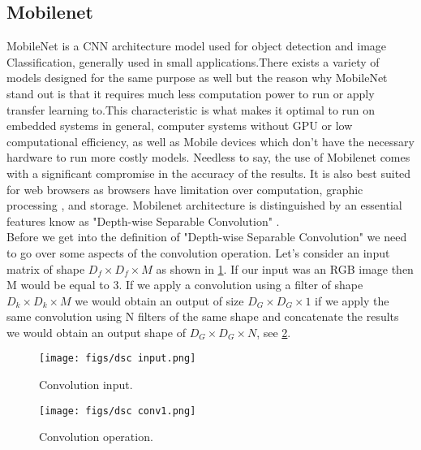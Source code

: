 \subsection{Mobilenet}
MobileNet is a CNN architecture model  used for object detection and image Classification, generally used in small applications.There exists a variety of models designed for the same purpose as well but the reason why MobileNet stand out is that it requires much less computation power to run or apply transfer learning to.This characteristic is what makes it optimal to run on embedded systems in general, computer systems without GPU or low computational efficiency, as well as Mobile devices which don't have the necessary hardware to run more costly models. Needless to say, the use of Mobilenet comes with a significant compromise in the accuracy of the results. It is also best suited for web browsers as browsers have limitation over computation, graphic processing , and storage. Mobilenet architecture is distinguished by an essential features know as "Depth-wise Separable Convolution" \cite{b11}.\\
Before we get into the definition of "Depth-wise Separable Convolution" we need to go over some aspects of the convolution operation. Let's consider an input matrix of shape $D_{f} \times D_{f} \times M $ as shown in \cref{fig:dsc_input}. If our input was an RGB image then M would be equal to 3. If we apply a convolution using a filter of shape $D_{k} \times D_{k} \times M $ we would obtain an output of size $D_{G} \times D_{G} \times 1 $ if we apply the same convolution using N filters of the same shape and concatenate the results we would obtain an output shape of $D_{G} \times D_{G} \times N $, see \cref{fig:dsc_conv1}.

\begin{figure}[ht]
	\centering
	\texttt{[image: figs/dsc input.png]}
	\caption{Convolution input.}\label{fig:dsc_input}
\end{figure}

\begin{figure}[ht]
	\centering
	\texttt{[image: figs/dsc conv1.png]}
	\caption{Convolution operation.}\label{fig:dsc_conv1}
\end{figure}

